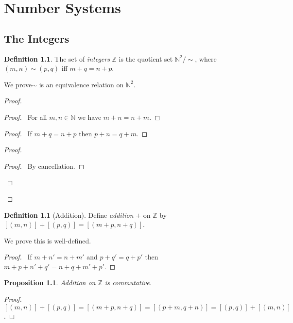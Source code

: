 \documentclass{book}
\let\qed\relax
\newtheorem{prop}[ax]{Proposition}
\theoremstyle{definition}
\newtheorem{df}[ax]{Definition}
\begin{document}
\chapter{Number Systems}

\section{The Integers}

\begin{df}
The set of \emph{integers} $\mathbb{Z}$ is the quotient set $\mathbb{N}^2 / \sim$, where $(m,n) \sim (p,q)$ iff $m + q = n + p$.

We prove$\sim$ is an equivalence relation on $\mathbb{N}^2$.
\end{df}

\begin{proof}
\pf
{}
\begin{proof}
	\pf\ For all $m,n \in \mathbb{N}$ we have $m + n = n + m$.
\end{proof}
\begin{proof}
	\pf\ If $m + q = n + p$ then $p + n = q + m$.
\end{proof}
\begin{proof}
	\begin{proof}
		\pf\ By cancellation.
	\end{proof}
\end{proof}
\qed
\end{proof}

\begin{df}[Addition]
Define \emph{addition} $+$ on $\mathbb{Z}$ by $[(m,n)] + [(p,q)] = [(m+p,n+q)]$.

We prove this is well-defined.
\end{df}

\begin{proof}
\pf\ If $m + n' = n + m'$ and $p + q' = q + p'$ then $m + p + n' + q' = n + q + m' + p'$. \qed
\end{proof}

\begin{prop}
\label{prop:plusZcomm}
Addition on $\mathbb{Z}$ is commutative.
\end{prop}

\begin{proof}
\pf\ $[(m,n)] + [(p,q)] = [(m+p,n+q)] = [(p+m,q+n)] = [(p,q)] + [(m,n)]$. \qed
\end{proof}
\end{document}
